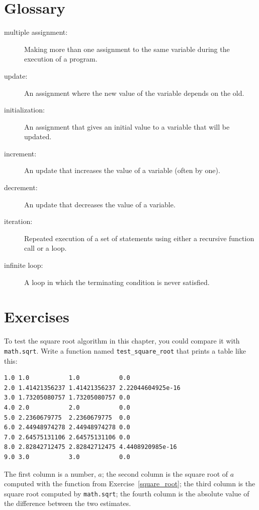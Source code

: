 \documentclass[10pt]{book}
\begin{document}
\section{Glossary}

\begin{description}

\item[multiple assignment:] Making more than one assignment to the same
variable during the execution of a program.

\item[update:] An assignment where the new value of the variable
depends on the old.

\item[initialization:] An assignment that gives an initial value to
a variable that will be updated.

\item[increment:] An update that increases the value of a variable
(often by one).

\item[decrement:] An update that decreases the value of a variable.

\item[iteration:] Repeated execution of a set of statements using
either a recursive function call or a loop.

\item[infinite loop:] A loop in which the terminating condition is
never satisfied.

\end{description}


\section{Exercises}

\begin{ex}


To test the square root algorithm in this chapter, you could compare
it with {\tt math.sqrt}.  Write a function named \verb"test_square_root"
that prints a table like this:

\beforeverb
\begin{verbatim}
1.0 1.0           1.0           0.0
2.0 1.41421356237 1.41421356237 2.22044604925e-16
3.0 1.73205080757 1.73205080757 0.0
4.0 2.0           2.0           0.0
5.0 2.2360679775  2.2360679775  0.0
6.0 2.44948974278 2.44948974278 0.0
7.0 2.64575131106 2.64575131106 0.0
8.0 2.82842712475 2.82842712475 4.4408920985e-16
9.0 3.0           3.0           0.0

\end{verbatim}
\afterverb
%
The first column is a number, $a$; the second column is
the square root of $a$ computed with the function from
Exercise~\ref{square_root}; the third column is the square root computed
by {\tt math.sqrt}; the fourth column is the absolute value
of the difference between the two estimates.
\end{ex}
\end{document}
